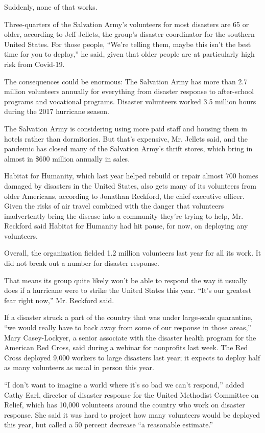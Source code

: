 Suddenly, none of that works.

Three-quarters of the Salvation Army's volunteers for most disasters are
65 or older, according to Jeff Jellets, the group's disaster coordinator
for the southern United States. For those people, ``We're telling them,
maybe this isn't the best time for you to deploy,'' he said, given that
older people are at particularly high risk from Covid-19.

The consequences could be enormous: The Salvation Army has more than 2.7
million volunteers annually for everything from disaster response to
after-school programs and vocational programs. Disaster volunteers
worked 3.5 million hours during the 2017 hurricane season.

The Salvation Army is considering using more paid staff and housing them
in hotels rather than dormitories. But that's expensive, Mr. Jellets
said, and the pandemic has closed many of the Salvation Army's thrift
stores, which bring in almost in \$600 million annually in sales.

Habitat for Humanity, which last year helped rebuild or repair almost
700 homes damaged by disasters in the United States, also gets many of
its volunteers from older Americans, according to Jonathan Reckford, the
chief executive officer. Given the risks of air travel combined with the
danger that volunteers inadvertently bring the disease into a community
they're trying to help, Mr. Reckford said Habitat for Humanity had hit
pause, for now, on deploying any volunteers.

Overall, the organization fielded 1.2 million volunteers last year for
all its work. It did not break out a number for disaster response.

That means its group quite likely won't be able to respond the way it
usually does if a hurricane were to strike the United States this year.
``It's our greatest fear right now,'' Mr. Reckford said.

If a disaster struck a part of the country that was under large-scale
quarantine, ``we would really have to back away from some of our
response in those areas,'' Mary Casey-Lockyer, a senior associate with
the disaster health program for the American Red Cross, said during a
webinar for nonprofits last week. The Red Cross deployed 9,000 workers
to large disasters last year; it expects to deploy half as many
volunteers as usual in person this year.

``I don't want to imagine a world where it's so bad we can't respond,''
added Cathy Earl, director of disaster response for the United Methodist
Committee on Relief, which has 10,000 volunteers around the country who
work on disaster response. She said it was hard to project how many
volunteers would be deployed this year, but called a 50 percent decrease
``a reasonable estimate.''

